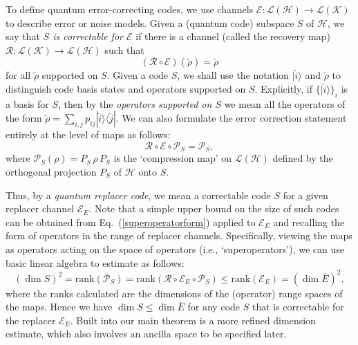 \documentclass[11pt]{amsart}
\theoremstyle{definition}
\theoremstyle{definition}
\theoremstyle{definition}
\newcommand{\1}{\mathbb{I}}
\def\ket#1{| #1 \rangle}
\def\kb#1#2{|#1\rangle\!\langle #2 |}
\begin{document}
To define quantum error-correcting codes, we use channels $\mathcal E: \mathcal L(\mathcal H) \rightarrow \mathcal L(\mathcal K)$ to describe error or noise models. Given a (quantum code) subspace $S$ of $\mathcal H$, we say that {\it $S$ is correctable for $\mathcal E$} if there is a channel (called the recovery map) $\mathcal R: \mathcal L(\mathcal K) \rightarrow \mathcal L(\mathcal H)$ such that 
\[
(\mathcal R \circ \mathcal E)(\widetilde{\rho}) = \widetilde{\rho}
\]
for all $\widetilde{\rho}$ supported on $S$. Given a code $S$, we shall use the notation $\ket{\widetilde{i}}$ and $\widetilde{\rho}$ to distinguish code basis states and operators supported on $S$. Explicitly, if  $\{ \ket{\widetilde{i}} \}_i$ is a basis for $S$, then by the {\it operators supported on $S$} we mean all the operators of the form $\widetilde{\rho} = \sum_{i,j} p_{ij} \kb{\widetilde{i}}{\widetilde{j}}$. We can also formulate the error correction statement entirely at the level of maps as follows: 
\begin{equation}\label{superoperatorform}
\mathcal R \circ \mathcal E \circ \mathcal P_S = \mathcal P_S , 
\end{equation}
where $\mathcal P_S (\rho) = P_S \, \rho \, P_S$ is the `compression map' on $\mathcal L(\mathcal H)$ defined by the orthogonal projection $P_S$ of $\mathcal H$ onto $S$.

Thus, by a {\it quantum replacer code}, we mean a correctable code $S$ for a given replacer channel $\mathcal E_E$. 
Note that a simple upper bound on the size of such codes can be obtained from Eq.~(\ref{superoperatorform}) applied to $\mathcal E_E$ and recalling the form of operators in the range of replacer channels. Specifically, viewing the maps as operators acting on the space of operators (i.e., `superoperators'), we can use basic linear algebra to estimate as follows: 
\[
(\dim S)^2 = \mathrm{rank}(\mathcal P_S) = \mathrm{rank}(\mathcal R \circ \mathcal E_E \circ \mathcal P_S) \leq \mathrm{rank} (\mathcal E_E) = (\dim \overline{E})^2, 
\]
where the ranks calculated are the dimensions of the (operator) range spaces of the maps. 
Hence we have $\dim S \leq \dim \overline{E}$ for any code $S$ that is correctable for the replacer $\mathcal E_E$. Built into our main theorem is a more refined dimension estimate, which also involves an ancilla space to be specified later. 
\end{document}
